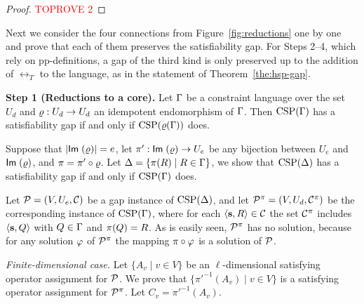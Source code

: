 \begin{proof}\textcolor{red}{TOPROVE 2}\end{proof}


Next we consider the four connections from Figure~\ref{fig:reductions} one by
one and prove that each of them preserves the satisfiability gap. For Steps
2--4, which rely on pp-definitions, a gap of the third kind is only preserved up
to the addition of $\rel_T$ to the language, as in the statement of
Theorem~\ref{the:hsp-gap}.

\smallskip

{\bf Step 1 (Reductions to a core).}
Let $\Gamma$ be a constraint language over the set $U_d$ and $\varrho:U_d\to U_d$ an idempotent
endomorphism of $\Gamma$. Then ${\rm CSP}(\Gamma)$ has a satisfiability gap if and only if ${\rm CSP}(\varrho(\Gamma))$ does.

\smallskip

Suppose that $|{\sf Im}\;(\varrho)|=e$, let $\pi':{\sf Im}\;(\varrho)\to U_e$ be any bijection between $U_e$ and ${\sf Im}\;(\varrho)$, and $\pi=\pi'\circ\varrho$. Let $\Delta=\{\pi(R)\mid R\in\Gamma\}$, we show that ${\rm CSP}(\Delta)$ has a satisfiability gap if and only if ${\rm CSP}(\Gamma)$ does.

Let ${\mathcal P}=(V,U_e,{\mathcal C})$ be a gap instance of ${\rm CSP}(\Delta)$, and let ${\mathcal P}^\pi=(V,U_d,{\mathcal C}^\pi)$ be the corresponding instance of ${\rm CSP}(\Gamma)$, where for each $\langle {\bf s},R \rangle\in{\mathcal C}$ the set ${\mathcal C}^\pi$ includes $\langle {\bf s},Q \rangle$ with $Q\in\Gamma$ and $\pi(Q)=R$. As is easily seen, ${\mathcal P}^\pi$  has no solution, because for any solution $\varphi$ of ${\mathcal P}^\pi$ the mapping $\pi\circ\varphi$ is a solution of ${\mathcal P}$. 

{\it Finite-dimensional case.}
Let $\{A_v\mid v\in V\}$ be an $\ell$-dimensional satisfying operator assignment for ${\mathcal P}$. We prove that $\{\pi'^{-1}(A_v)\mid v\in V\}$ is a satisfying operator assignment for ${\mathcal P}^\pi$. Let $C_v=\pi'^{-1}(A_v)$.

